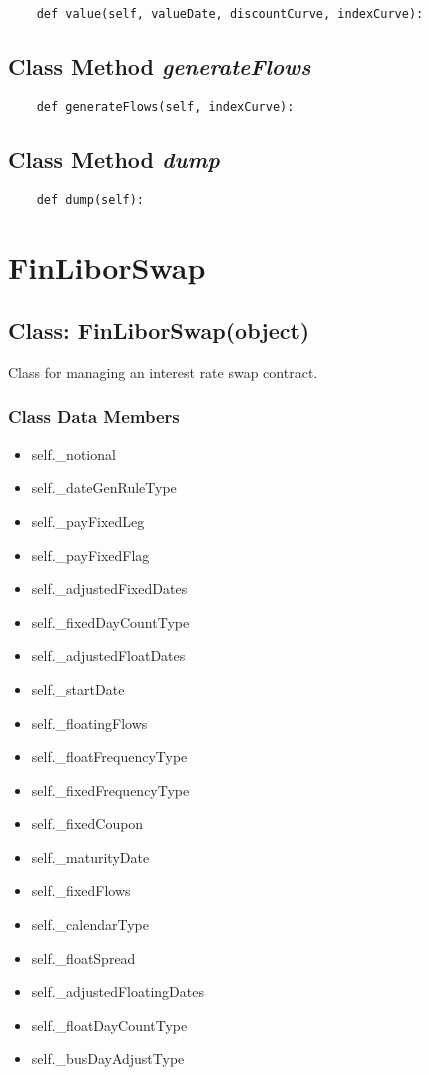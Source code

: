 \documentclass[twoside,11pt]{book}
\begin{document}
\begin{lstlisting}
    def value(self, valueDate, discountCurve, indexCurve):
\end{lstlisting}

\subsection{Class Method {\it generateFlows}}


\begin{lstlisting}
    def generateFlows(self, indexCurve):
\end{lstlisting}

\subsection{Class Method {\it dump}}


\begin{lstlisting}
    def dump(self):
\end{lstlisting}

\newpage
\section{FinLiborSwap}

\subsection{Class: FinLiborSwap(object)}
Class for managing an interest rate swap contract. 

\subsubsection{Class Data Members}
\begin{itemize}
\item{self.\_notional}
\item{self.\_dateGenRuleType}
\item{self.\_payFixedLeg}
\item{self.\_payFixedFlag}
\item{self.\_adjustedFixedDates}
\item{self.\_fixedDayCountType}
\item{self.\_adjustedFloatDates}
\item{self.\_startDate}
\item{self.\_floatingFlows}
\item{self.\_floatFrequencyType}
\item{self.\_fixedFrequencyType}
\item{self.\_fixedCoupon}
\item{self.\_maturityDate}
\item{self.\_fixedFlows}
\item{self.\_calendarType}
\item{self.\_floatSpread}
\item{self.\_adjustedFloatingDates}
\item{self.\_floatDayCountType}
\item{self.\_busDayAdjustType}
\end{itemize}
\end{document}
